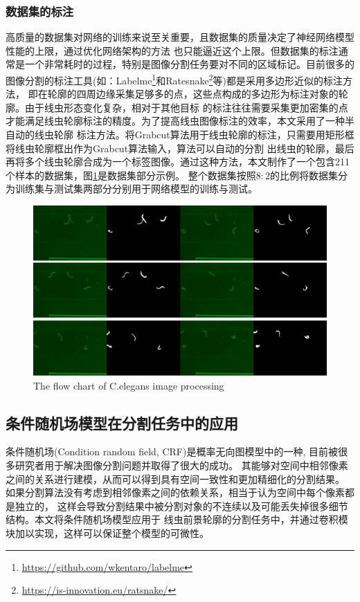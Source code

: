 \subsubsection{数据集的标注}
	高质量的数据集对网络的训练来说至关重要，且数据集的质量决定了神经网络模型性能的上限，通过优化网络架构的方法
	也只能逼近这个上限。但数据集的标注通常是一个非常耗时的过程，特别是图像分割任务要对不同的区域标记。目前很多的
	图像分割的标注工具(如：Labelme\footnote{\url{https://github.com/wkentaro/labelme}}和Ratesnake\footnote{\url{https://is-innovation.eu/ratsnake/}}等)都是采用多边形近似的标注方法，
	即在轮廓的四周边缘采集足够多的点，这些点构成的多边形为标注对象的轮廓。由于线虫形态变化复杂，相对于其他目标
	的标注往往需要采集更加密集的点才能满足线虫轮廓标注的精度。为了提高线虫图像标注的效率，本文采用了一种半自动的线虫轮廓
	标注方法。将Grabcut算法用于线虫轮廓的标注，只需要用矩形框将线虫轮廓框出作为Grabcut算法输入，算法可以自动的分割
	出线虫的轮廓，最后再将多个线虫轮廓合成为一个标签图像。通过这种方法，本文制作了一个包含211个样本的数据集，图\ref{fig:dataset}是数据集部分示例。
	整个数据集按照$8:2$的比例将数据集分为训练集与测试集两部分分别用于网络模型的训练与测试。
	\begin{figure}[h]
	  \centering
	  \includegraphics[width=14cm]{figure/chap3/dataset.jpg}
		{The flow chart of C.elegans image processing}
	  \label{fig:dataset}
	\end{figure}
\subsection{条件随机场模型在分割任务中的应用}
	条件随机场(Condition random field, CRF)是概率无向图模型中的一种\cite{李航2012统计学习方法},
	目前被很多研究者用于解决图像分割问题并取得了很大的成功\cite{zheng2015conditional,wang2017adaptive,chen2018deeplab}。
	其能够对空间中相邻像素之间的关系进行建模，从而可以得到具有空间一致性和更加精细化的分割结果。
	如果分割算法没有考虑到相邻像素之间的依赖关系，相当于认为空间中每个像素都是独立的，
	这样会导致分割结果中被分割对象的不连续以及可能丢失掉很多细节结构。本文将条件随机场模型应用于
	线虫前景轮廓的分割任务中，并通过卷积模块加以实现，这样可以保证整个模型的可微性。
		
